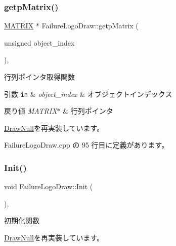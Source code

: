 \subsubsection{\texorpdfstring{getp\+Matrix()}{getpMatrix()}}
{\footnotesize\ttfamily \mbox{\hyperlink{_vector3_d_8h_a032295cd9fb1b711757c90667278e744}{M\+A\+T\+R\+IX}} $\ast$ Failure\+Logo\+Draw\+::getp\+Matrix (\begin{DoxyParamCaption}\item[{unsigned}]{object\+\_\+index }\end{DoxyParamCaption})\hspace{0.3cm}{\ttfamily [override]}, {\ttfamily [virtual]}}



行列ポインタ取得関数 


\begin{DoxyParams}[1]{引数}
\mbox{\tt in}  & {\em object\+\_\+index} & オブジェクトインデックス \\
\hline
\end{DoxyParams}

\begin{DoxyRetVals}{戻り値}
{\em M\+A\+T\+R\+I\+X$\ast$} & 行列ポインタ \\
\hline
\end{DoxyRetVals}


\mbox{\hyperlink{class_draw_null_a9aac059eb3b5d1f77e8bd3aa0647cff9}{Draw\+Null}}を再実装しています。



 Failure\+Logo\+Draw.\+cpp の 95 行目に定義があります。

\mbox{\label{class_failure_logo_draw_a718d587edcabb1feea72153a79a65176}} 
\subsubsection{\texorpdfstring{Init()}{Init()}}
{\footnotesize\ttfamily void Failure\+Logo\+Draw\+::\+Init (\begin{DoxyParamCaption}{ }\end{DoxyParamCaption})\hspace{0.3cm}{\ttfamily [override]}, {\ttfamily [virtual]}}



初期化関数 



\mbox{\hyperlink{class_draw_null_a20aef1e54c1a158b741bfd731e18efdf}{Draw\+Null}}を再実装しています。



